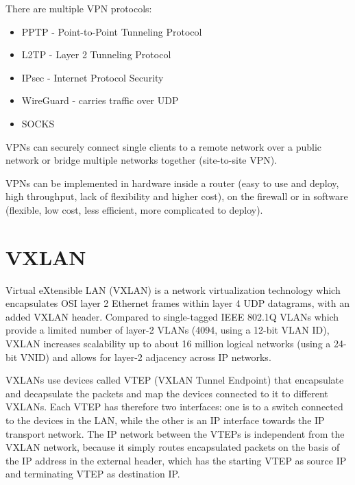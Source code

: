 There are multiple VPN protocols:
\begin{itemize}
  \item PPTP - Point-to-Point Tunneling Protocol
  \item L2TP - Layer 2 Tunneling Protocol
  \item IPsec - Internet Protocol Security
  \item WireGuard - carries traffic over UDP
  \item SOCKS
\end{itemize}

VPNs can securely connect single clients to a remote network over a public network or bridge multiple networks together (site-to-site VPN).

VPNs can be implemented in hardware inside a router (easy to use and deploy, high throughput, lack of flexibility and higher cost), on the firewall or in software (flexible, low cost, less efficient, more complicated to deploy).

\section{VXLAN}
Virtual eXtensible LAN (VXLAN) is a network virtualization technology which encapsulates OSI layer 2 Ethernet frames within layer 4 UDP datagrams, with an added VXLAN header. Compared to single-tagged IEEE 802.1Q VLANs which provide a limited number of layer-2 VLANs (4094, using a 12-bit VLAN ID), VXLAN increases scalability up to about 16 million logical networks (using a 24-bit VNID) and allows for layer-2 adjacency across IP networks.


VXLANs use devices called VTEP (VXLAN Tunnel Endpoint) that encapsulate and decapsulate the packets and map the devices connected to it to different VXLANs. Each VTEP has therefore two interfaces: one is to a switch connected to the devices in the LAN, while the other is an IP interface towards the IP transport network. The IP network between the VTEPs is independent from the VXLAN network, because it simply routes encapsulated packets on the basis of the IP address in the external header, which has the starting VTEP as source IP and terminating VTEP as destination IP.

